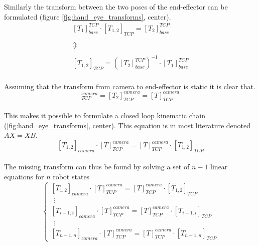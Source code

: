 \noindent Similarly the transform between the two poses of the end-effector can be formulated (figure \ref{fig:hand_eye_transforms}, center).\\

\begin{equation}
\begin{matrix}
[T_{1}]_{base}^{TCP} \cdot [T_{1,2}]_{TCP} = [T_{2}]_{base}^{TCP} \\ 
\\ 
\Updownarrow \\ 
\\ 
[T_{1,2}]_{TCP} = ([T_{2}]_{base}^{TCP})^{-1} \cdot  [T_{1}]_{base}^{TCP}
\end{matrix}
\end{equation}\\ 

\noindent Assuming that the transform from camera to end-effector is static it is clear that.\\

\begin{equation}
[T_{1}]_{TCP}^{camera} = [T_{2}]_{TCP}^{camera} = [T]_{TCP}^{camera}
\end{equation}\\ 

\noindent This makes it possible to formulate a closed loop kinematic chain (\ref{fig:hand_eye_transforms}, center). This equation is in most literature denoted $ AX=XB $. \\

\begin{equation} \label{equ:closed_loop}
	[T_{1,2}]_{camera} \cdot [T]_{TCP}^{camera} = [T]_{TCP}^{camera} \cdot [T_{1,2}]_{TCP}
\end{equation}\\ 

\noindent The missing transform can thus be found by solving a set of $ n-1 $ linear equations for $ n $ robot states \\

\begin{equation} \label{eq:linear_equations}
\left\{\begin{matrix}
[T_{1,2}]_{camera} \cdot [T]_{TCP}^{camera} = [T]_{TCP}^{camera} \cdot [T_{1,2}]_{TCP} \\ 
\ \ \vdots 
\\ 
[T_{i-1,i}]_{camera} \cdot [T]_{TCP}^{camera} = [T]_{TCP}^{camera} \cdot [T_{i-1,i}]_{TCP}\\ 
\ \ \vdots 
\\ 
[T_{n-1,n}]_{camera} \cdot [T]_{TCP}^{camera} = [T]_{TCP}^{camera} \cdot [T_{n-1,n}]_{TCP}
\end{matrix}\right.
\end{equation}\\ 

